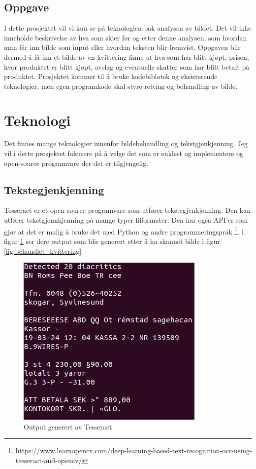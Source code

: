 \documentclass{article}
\begin{document}
\subsection{Oppgave}
I dette prosjektet vil vi kun se på teknologien bak analysen av bildet. Det vil ikke inneholde beskrivelse av hva som skjer før og etter denne analysen, som hvordan man får inn bilde som input eller hvordan teksten blir fremvist. Oppgaven blir dermed å få inn et bilde av en kvittering finne ut hva som har blitt kjøpt, prisen, hvor produktet er blitt kjøpt, avslag og eventuelle skatter som har blitt betalt på produktet. Prosjektet kommer til å bruke kodebiblotek og eksisterende teknologier, men egen programkode skal styre retting og behandling av bilde.

\section{Teknologi}
Det finnes mange teknologier innenfor bildebehandling og tekstgjenkjenning. Jeg vil i dette prosjektet fokusere på å velge det som er enklest og implementere og open-source programvare der det er tilgjengelig.
\subsection{Tekstegjenkjenning}
Tesseract er et open-source programvare som utfører tekstegjenkjenning. Den kan utfører tekstgjennkjenning på mange typer filformater. Den har også API'er som gjør at det er mulig å bruke det med Python og andre programmeringspråk \footnote{https://www.learnopencv.com/deep-learning-based-text-recognition-ocr-using-tesseract-and-opencv/}. I figur \ref{fig:tesseract_output} ser dere output som blir generert etter å ha skannet bilde i figur \ref{fig:behandlet_kvittering}

\begin{figure}[h]
\centering
\includegraphics[scale=0.5]{images/output.png}
\caption{Output generert av Tesseract}
\label{fig:tesseract_output}
\end{figure}
\end{document}

